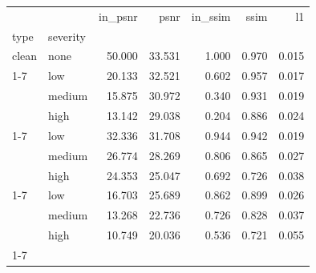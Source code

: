 \begin{tabular}{llrrrrr}
\toprule
 &  & in_psnr & psnr & in_ssim & ssim & l1 \\
type & severity &  &  &  &  &  \\
\midrule
clean & none & 50.000 & 33.531 & 1.000 & 0.970 & 0.015 \\
\cline{1-7}
\multirow[t]{3}{*}{salt_pepper} & low & 20.133 & 32.521 & 0.602 & 0.957 & 0.017 \\
 & medium & 15.875 & 30.972 & 0.340 & 0.931 & 0.019 \\
 & high & 13.142 & 29.038 & 0.204 & 0.886 & 0.024 \\
\cline{1-7}
\multirow[t]{3}{*}{blur} & low & 32.336 & 31.708 & 0.944 & 0.942 & 0.019 \\
 & medium & 26.774 & 28.269 & 0.806 & 0.865 & 0.027 \\
 & high & 24.353 & 25.047 & 0.692 & 0.726 & 0.038 \\
\cline{1-7}
\multirow[t]{3}{*}{occlusion} & low & 16.703 & 25.689 & 0.862 & 0.899 & 0.026 \\
 & medium & 13.268 & 22.736 & 0.726 & 0.828 & 0.037 \\
 & high & 10.749 & 20.036 & 0.536 & 0.721 & 0.055 \\
\cline{1-7}
\bottomrule
\end{tabular}
